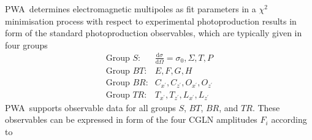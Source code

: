 \documentclass[a4paper,10pt]{article}
\def\PWA{\ttfamily PWA\rmfamily\ }
\def\d{\mathrm{d}}
\begin{document}
\PWA determines electromagnetic multipoles as fit parameters in a $\chi^2$ minimisation process with respect to
experimental photoproduction results in form of the standard photoproduction observables, which are typically
given in four groups
\begin{displaymath}
\begin{array}{ll}
 \mbox{Group $S$:} &\frac{\d\sigma}{\d\Omega} = \sigma_0, \Sigma, T, P\\
 \mbox{Group $BT$:}& E, F, G, H\\
 \mbox{Group $BR$:}& C_{x^\prime}, C_{z^\prime}, O_{x^\prime}, O_{z^\prime}\\
 \mbox{Group $TR$:}& T_{x^\prime}, T_{z^\prime}, L_{x^\prime}, L_{z^\prime}
\end{array}
\end{displaymath}
\PWA supports observable data for all groups $S$, $BT$, $BR$, and $TR$. These observables can be expressed
in form of the four CGLN amplitudes $F_i$ according to
\end{document}
